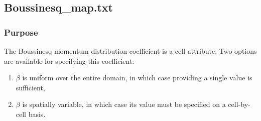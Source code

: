 \subsection{Boussinesq\_map.txt}
%
\subsubsection{Purpose}
The Boussinesq momentum distribution coefficient is a cell attribute. Two options are available for specifying this coefficient:
\begin{enumerate}
    \item $\beta$ is uniform over the entire domain, in which case providing a single value is sufficient,
    \item $\beta$ is spatially variable, in which case its value must be specified on a cell-by-cell basis.
\end{enumerate}
%
